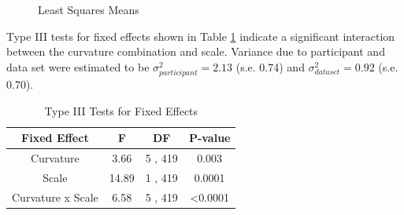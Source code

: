 \begin{appendix}
\begin{figure}
{}

\caption{Least Squares Means}\label{fig:lsmeans-plot}
\end{figure}

Type III tests for fixed effects shown in Table
\ref{tab:type3-fixed-effects} indicate a significant interaction between
the curvature combination and scale. Variance due to participant and
data set were estimated to be \(\sigma^2_{participant} = 2.13\) (s.e.
0.74) and \(\sigma^2_{data set} = 0.92\) (s.e. 0.70).

\begin{table}

\caption{\label{tab:type3-fixed-effects}Type III Tests for Fixed Effects}
\centering
\begin{tabular}[t]{cccc}
\toprule
Fixed Effect & F & DF & P-value\\
\midrule
Curvature & 3.66 & 5 , 419 & 0.003\\
Scale & 14.89 & 1 , 419 & 0.0001\\
Curvature x Scale & 6.58 & 5 , 419 & <0.0001\\
\bottomrule
\end{tabular}
\end{table}
\end{appendix}
